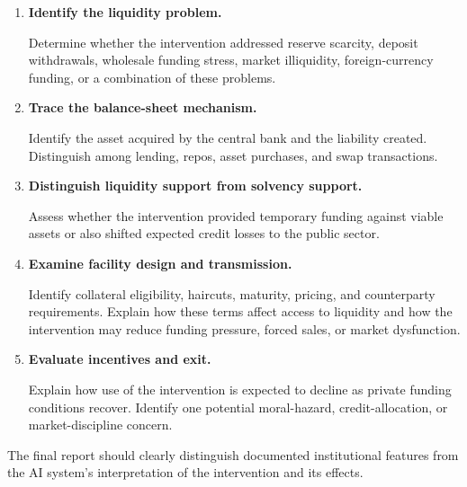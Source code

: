 \begin{enumerate}

\item \textbf{Identify the liquidity problem.}

Determine whether the intervention addressed reserve scarcity, deposit withdrawals, wholesale funding stress, market illiquidity, foreign-currency funding, or a combination of these problems.

\item \textbf{Trace the balance-sheet mechanism.}

Identify the asset acquired by the central bank and the liability created. Distinguish among lending, repos, asset purchases, and swap transactions.

\item \textbf{Distinguish liquidity support from solvency support.}

Assess whether the intervention provided temporary funding against viable assets or also shifted expected credit losses to the public sector.

\item \textbf{Examine facility design and transmission.}

Identify collateral eligibility, haircuts, maturity, pricing, and counterparty requirements. Explain how these terms affect access to liquidity and how the intervention may reduce funding pressure, forced sales, or market dysfunction.

\item \textbf{Evaluate incentives and exit.}

Explain how use of the intervention is expected to decline as private funding conditions recover. Identify one potential moral-hazard, credit-allocation, or market-discipline concern.

\end{enumerate}

The final report should clearly distinguish documented institutional features from the AI system's interpretation of the intervention and its effects.





